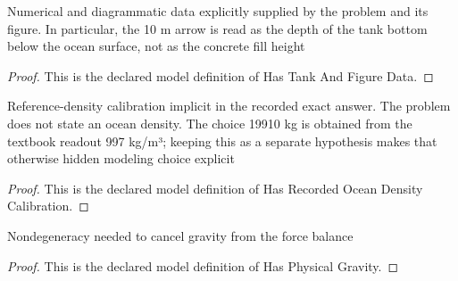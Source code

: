 \begin{definition}
  \label{def:physics:phyx-mini-0386:phyxminiproblems-problemphyxmini0386-hastankandfiguredata}
  Numerical and diagrammatic data explicitly supplied by the problem and its figure. In particular, the 10 m arrow is read as the depth of the tank bottom below the ocean surface, not as the concrete fill height
\end{definition}
\begin{proof}
  This is the declared model definition of Has Tank And Figure Data.
\end{proof}
\begin{definition}
  \label{def:physics:phyx-mini-0386:phyxminiproblems-problemphyxmini0386-hasrecordedoceandensitycalibration}
  Reference-density calibration implicit in the recorded exact answer. The problem does not state an ocean density. The choice 19910 kg is obtained from the textbook readout 997 kg/m³; keeping this as a separate hypothesis makes that otherwise hidden modeling choice explicit
\end{definition}
\begin{proof}
  This is the declared model definition of Has Recorded Ocean Density Calibration.
\end{proof}
\begin{definition}
  \label{def:physics:phyx-mini-0386:phyxminiproblems-problemphyxmini0386-hasphysicalgravity}
  Nondegeneracy needed to cancel gravity from the force balance
\end{definition}
\begin{proof}
  This is the declared model definition of Has Physical Gravity.
\end{proof}
